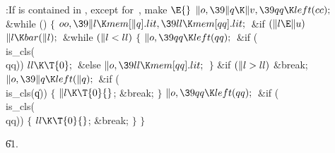 \B{}:If  is contained in , except for~, make
\X${}\E{}$\6
$\|o,\39\|q\K\|v,\39\\{qq}\K\\{left}(\\{cc});{}$\6
\&{while} ()\5
${}\{{}$\1\6
${}\\{oo},\39\|l\K\\{mem}[\|q].\\{lit},\39\\{ll}\K\\{mem}[\\{qq}].\\{lit};{}$\6
\&{if} ${}(\|l\E\|u){}$\1\5
${}\|l\K\\{bar}(\|l);{}$\2\6
\&{while} ${}(\|l<\\{ll}){}$\5
${}\{{}$\1\6
${}\|o,\39\\{qq}\K\\{left}(\\{qq});{}$\6
\&{if} (\\{is\_cls}(\\{qq}))\1\5
${}\\{ll}\K\T{0};{}$\2\6
\&{else}\1\5
${}\|o,\39\\{ll}\K\\{mem}[\\{qq}].\\{lit};{}$\2\6
\4${}\}{}$\2\6
\&{if} ${}(\|l>\\{ll}){}$\1\5
\&{break};\2\6
${}\|o,\39\|q\K\\{left}(\|q);{}$\6
\&{if} (\\{is\_cls}(\|q))\5
${}\{{}$\1\6
${}\|l\K\T{0}{}$;\5
\&{break};\6
\4${}\}{}$\2\6
${}\|o,\39\\{qq}\K\\{left}(\\{qq});{}$\6
\&{if} (\\{is\_cls}(\\{qq}))\5
${}\{{}$\1\6
${}\\{ll}\K\T{0}{}$;\5
\&{break};\6
\4${}\}{}$\2\6
\4${}\}{}$\2\par
\U61.\fi


